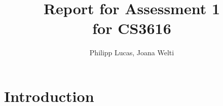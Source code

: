 \documentclass[a4paper,10pt]{scrartcl}
\title{Report for Assessment 1 \\ \large{for CS3616}}
\author{Philipp Lucas, Joana Welti}
\begin{document}
\maketitle
\newpage

\tableofcontents

\newpage

\section{Introduction}
\end{document}
